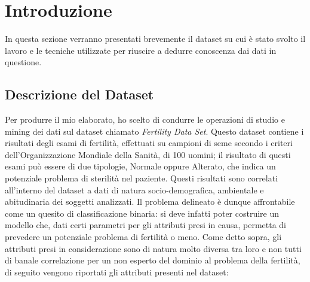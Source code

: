   \section{Introduzione}
  In questa sezione verranno presentati brevemente il dataset su cui è stato svolto il lavoro e le tecniche utilizzate per riuscire a dedurre conoscenza dai dati in questione.
  \subsection{Descrizione del Dataset}
  Per produrre il mio elaborato, ho scelto di condurre le operazioni di studio e mining dei dati sul dataset chiamato \textit{Fertility Data Set}.
  Questo dataset contiene i risultati degli esami di fertilità, effettuati su campioni di seme secondo i criteri dell'Organizzazione Mondiale della Sanità, di 100 uomini; il risultato di questi esami può essere di due tipologie, Normale oppure Alterato, che indica un potenziale problema di sterilità nel paziente. Questi risultati sono correlati all'interno del dataset a dati di natura socio-demografica, ambientale e abitudinaria dei soggetti analizzati. 
  Il problema delineato è dunque affrontabile come un quesito di  classificazione binaria: si deve infatti poter costruire un modello che, dati certi parametri per gli attributi presi in causa, permetta di prevedere un potenziale problema di fertilità o meno.
  Come detto sopra, gli attributi presi in considerazione sono di natura molto diversa tra loro e non tutti di banale correlazione per un non esperto del dominio al problema della fertilità, di seguito vengono riportati gli attributi presenti nel dataset:
